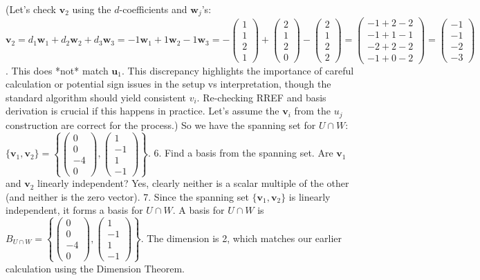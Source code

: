 \documentclass[11pt]{article}
\theoremstyle{definition}
\theoremstyle{remark}
\newcommand{\vecu}{\mathbf{u}}
\newcommand{\vecv}{\mathbf{v}}
\newcommand{\vecw}{\mathbf{w}}
\begin{document}
    (Let's check $\vecv_2$ using the $d$-coefficients and $\vecw_j$'s: $\vecv_2 = d_1 \vecw_1 + d_2 \vecw_2 + d_3 \vecw_3 = -1 \vecw_1 + 1 \vecw_2 - 1 \vecw_3 = -\begin{pmatrix} 1 \\ 1 \\ 2 \\ 1 \end{pmatrix} + \begin{pmatrix} 2 \\ 1 \\ 2 \\ 0 \end{pmatrix} - \begin{pmatrix} 2 \\ 1 \\ 2 \\ 2 \end{pmatrix} = \begin{pmatrix} -1+2-2 \\ -1+1-1 \\ -2+2-2 \\ -1+0-2 \end{pmatrix} = \begin{pmatrix} -1 \\ -1 \\ -2 \\ -3 \end{pmatrix}$. This does *not* match $\vecu_1$. This discrepancy highlights the importance of careful calculation or potential sign issues in the setup vs interpretation, though the standard algorithm should yield consistent $v_i$. Re-checking RREF and basis derivation is crucial if this happens in practice. Let's assume the $\vecv_i$ from the $u_j$ construction are correct for the process.)
    So we have the spanning set for $U \cap W$: $\{\vecv_1, \vecv_2\} = \left\{ \begin{pmatrix} 0 \\ 0 \\ -4 \\ 0 \end{pmatrix}, \begin{pmatrix} 1 \\ -1 \\ 1 \\ -1 \end{pmatrix} \right\}$.
6.  Find a basis from the spanning set. Are $\vecv_1$ and $\vecv_2$ linearly independent? Yes, clearly neither is a scalar multiple of the other (and neither is the zero vector).
7.  Since the spanning set $\{\vecv_1, \vecv_2\}$ is linearly independent, it forms a basis for $U \cap W$.
    A basis for $U \cap W$ is $B_{U \cap W} = \left\{ \begin{pmatrix} 0 \\ 0 \\ -4 \\ 0 \end{pmatrix}, \begin{pmatrix} 1 \\ -1 \\ 1 \\ -1 \end{pmatrix} \right\}$.
    The dimension is 2, which matches our earlier calculation using the Dimension Theorem.
\end{document}
